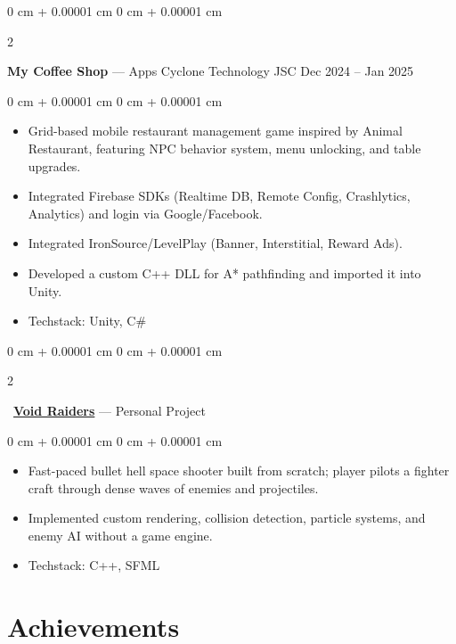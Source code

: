 \documentclass[10pt, letterpaper]{article}
\newenvironment{highlights}{
    \begin{itemize}[
        topsep=0.10 cm,
        parsep=0.10 cm,
        partopsep=0pt,
        itemsep=0pt,
        leftmargin=0 cm + 10pt
    ]
}{
    \end{itemize}
} %
\newenvironment{onecolentry}{
    \begin{adjustwidth}{
        0 cm + 0.00001 cm
    }{
        0 cm + 0.00001 cm
    }
}{
    \end{adjustwidth}
} %
\newenvironment{twocolentry}[2][]{
    \onecolentry
    \def\secondColumn{#2}
    \setcolumnwidth{\fill, 4.5 cm}
    \begin{paracol}{2}
}{
    \switchcolumn \raggedleft \secondColumn
    \end{paracol}
    \endonecolentry
} %
\begin{document}
        \begin{twocolentry}{
            Dec 2024 -- Jan 2025
        }
            \textbf{My Coffee Shop} — Apps Cyclone Technology JSC\end{twocolentry}
        \vspace{0.10 cm}
        \begin{onecolentry}
            \begin{highlights}
                \item Grid-based mobile restaurant management game inspired by Animal Restaurant, featuring NPC behavior system, menu unlocking, and table upgrades.
                \item Integrated Firebase SDKs (Realtime DB, Remote Config, Crashlytics, Analytics) and login via Google/Facebook.
                \item Integrated IronSource/LevelPlay (Banner, Interstitial, Reward Ads).
                \item Developed a custom C++ DLL for A* pathfinding and imported it into Unity.
                \item Techstack: Unity, C\#
            \end{highlights}
        \end{onecolentry}

        \vspace{0.2 cm}

        \begin{twocolentry}{
            2022
        }
            \faLink\ \href{https://github.com/duybuihoang}{\textbf{Void Raiders}} — Personal Project\end{twocolentry}
        \vspace{0.10 cm}
        \begin{onecolentry}
            \begin{highlights}
                \item Fast-paced bullet hell space shooter built from scratch; player pilots a fighter craft through dense waves of enemies and projectiles.
                \item Implemented custom rendering, collision detection, particle systems, and enemy AI without a game engine.
                \item Techstack: C++, SFML
            \end{highlights}
        \end{onecolentry}


    \section{Achievements}
\end{document}
